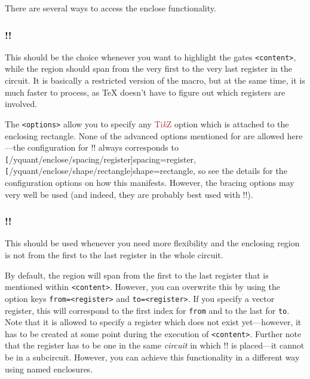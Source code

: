\documentclass{scrartcl}
\def\TikZ{\textcolor{brown}{Ti\textit kZ}}
\def\ttlink{\link\texttt}
\def\texlink{\link\tex}
\begin{document}
         There are several ways to access the enclose functionality.
         \subsubsection[\texorpdfstring{\tex{\encloseall}}{\textbackslash encloseall}]{\tex!!}\linkdef\encloseall
            This should be the choice whenever you want to highlight the gates \texttt{<content>}, while the region should span from the very first to the very last register in the circuit.
            It is basically a restricted version of the \texlink{\enclose} macro, but at the same time, it is much faster to process, as \TeX{} doesn't have to figure out which registers are involved.

            The \texttt{<options>} allow you to specify any \TikZ{} option which is attached to the enclosing rectangle.
            None of the advanced options mentioned for \texlink{\enclose} are allowed here---the configuration for \tex!\encloseall! always corresponds to \ttlink[/yquant/enclose/spacing/register]{spacing=register}, \ttlink[/yquant/enclose/shape/rectangle]{shape=rectangle}, so see the details for the configuration options on how this manifests.
            However, the bracing options may very well be used (and indeed, they are probably best used with \tex!\encloseall!).

         \subsubsection[\texorpdfstring{\tex{\enclose}}{\textbackslash enclose}]{\tex!!}\linkdef\enclose
            This should be used whenever you need more flexibility and the enclosing region is not from the first to the last register in the whole circuit.

            By default, the region will span from the first to the last register that is mentioned within \texttt{<content>}.
            However, you can overwrite this by using the option keys \texttt{from=<register>} and \texttt{to=<register>}.
            If you specify a vector register, this will correspond to the first index for \texttt{from} and to the last for \texttt{to}.
            Note that it is allowed to specify a register which does not exist yet---however, it has to be created at some point during the execution of \texttt{<content>}.
            Further note that the register has to be one in the same \emph{circuit} in which \tex!\enclose! is placed---it cannot be in a subcircuit.
            However, you can achieve this functionality in a different way using named enclosures.
\end{document}

